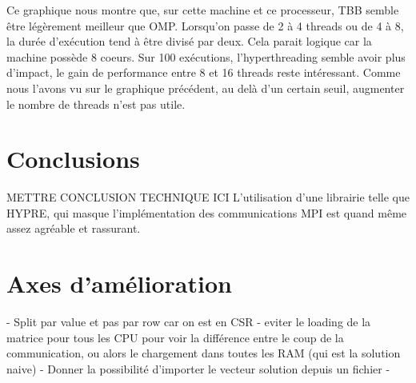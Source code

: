 \documentclass[10pt,twocolumn,letterpaper]{article}
\begin{document}

Ce graphique nous montre que, sur cette machine et ce processeur, TBB semble être légèrement meilleur que OMP.
Lorsqu'on passe de 2 à 4 threads ou de 4 à 8, la durée d'exécution tend à être divisé par deux.
Cela parait logique car la machine possède 8 coeurs.
Sur 100 exécutions, l'hyperthreading semble avoir plus d'impact, le gain de performance entre 8 et 16 threads reste intéressant.
Comme nous l'avons vu sur le graphique précédent, au delà d'un certain seuil, augmenter le nombre de threads n'est pas utile.

\section*{Conclusions}

METTRE CONCLUSION TECHNIQUE ICI
L'utilisation d'une librairie telle que HYPRE, qui masque l'implémentation des
communications MPI est quand même assez agréable et rassurant.

\section*{Axes d'amélioration}
- Split par value et pas par row car on est en CSR
- eviter le loading de la matrice pour tous les CPU pour voir la différence entre
le coup de la communication, ou alors le chargement dans toutes les RAM (qui 
est la solution naive)
- Donner la possibilité d'importer le vecteur solution depuis un fichier
- 

\end{document}
